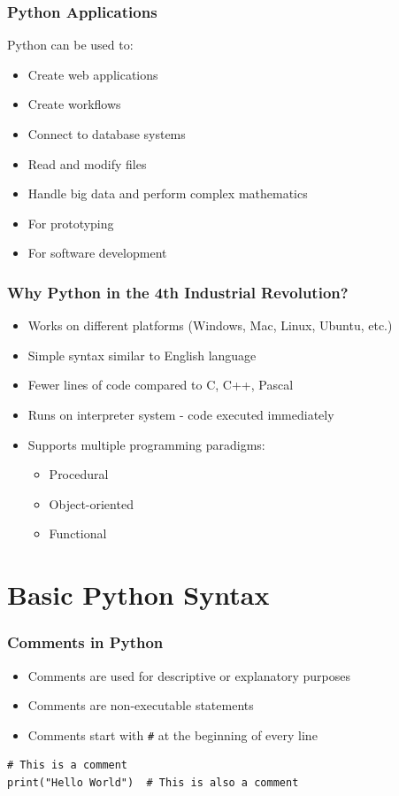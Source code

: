 \documentclass[aspectratio=169]{beamer}
\begin{document}
\begin{frame}
\frametitle{Python Applications}
Python can be used to:
\begin{itemize}
\item Create web applications
\item Create workflows
\item Connect to database systems
\item Read and modify files
\item Handle big data and perform complex mathematics
\item For prototyping
\item For software development
\end{itemize}
\end{frame}

\begin{frame}
\frametitle{Why Python in the 4th Industrial Revolution?}
\begin{itemize}
\item Works on different platforms (Windows, Mac, Linux, Ubuntu, etc.)
\item Simple syntax similar to English language
\item Fewer lines of code compared to C, C++, Pascal
\item Runs on interpreter system - code executed immediately
\item Supports multiple programming paradigms:
    \begin{itemize}
    \item Procedural
    \item Object-oriented
    \item Functional
    \end{itemize}
\end{itemize}
\end{frame}

\section{Basic Python Syntax}

\begin{frame}[fragile]
\frametitle{Comments in Python}
\begin{itemize}
\item Comments are used for descriptive or explanatory purposes
\item Comments are non-executable statements
\item Comments start with \texttt{\#} at the beginning of every line
\end{itemize}

\begin{lstlisting}
# This is a comment
print("Hello World")  # This is also a comment
\end{lstlisting}
\end{frame}
\end{document}

